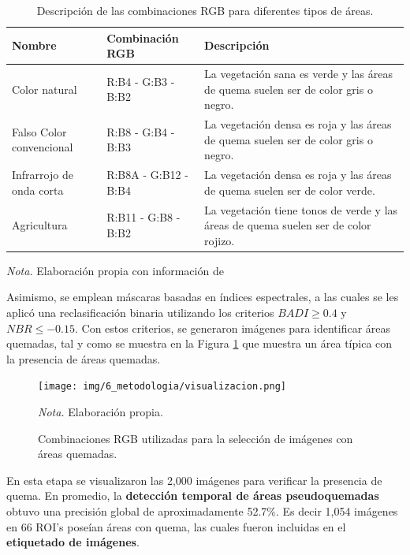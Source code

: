 \begin{table}[H]
    \centering
    \caption{Descripción de las combinaciones RGB para diferentes tipos de áreas.}
    \label{tab:combinaciones}
    \begin{tabularx}{\textwidth}{XXX}
        \hline
        \textbf{Nombre} & \textbf{Combinación RGB} & \textbf{Descripción}\\
        \hline
        Color natural & R:B4 - G:B3 - B:B2 & La vegetación sana es verde y las áreas de quema suelen ser de color gris o negro. \\
        Falso Color convencional & R:B8 - G:B4 - B:B3 & La vegetación densa es roja y las áreas de quema suelen ser de color gris o negro. \\
        Infrarrojo de onda corta & R:B8A - G:B12 - B:B4 & La vegetación densa es roja y las áreas de quema suelen ser de color verde. \\
        Agricultura & R:B11 - G:B8 - B:B2 & La vegetación tiene tonos de verde y las áreas de quema suelen ser de color rojizo. \\
        \hline
    \end{tabularx}
    \begin{flushleft}
        \textit{Nota.} Elaboración propia con información de \citet{Sentinel-Hub}        
        \vspace{-\baselineskip}
    \end{flushleft}
\end{table}


Asimismo, se emplean máscaras basadas en índices espectrales, a las cuales se les aplicó una reclasificación binaria utilizando los criterios 
$BADI \geq 0.4$ y $NBR \leq -0.15$. Con estos criterios, se generaron imágenes para identificar áreas quemadas, tal y como se muestra en la Figura \ref{fig:visualizacion} 
que muestra un área típica con la presencia de áreas quemadas.

\begin{figure}[H]
    \centering
    \caption{Combinaciones RGB utilizadas para la selección de imágenes con áreas quemadas.}
    \texttt{[image: img/6\_metodologia/visualizacion.png]}
    \label{fig:visualizacion}
    \begin{flushleft}
        \textit{Nota.} Elaboración propia.        
        \vspace{-\baselineskip}
    \end{flushleft}
\end{figure}

En esta etapa se visualizaron las 2,000 imágenes para verificar la presencia de quema. En promedio, la \textbf{detección temporal de áreas pseudoquemadas} obtuvo una precisión global de aproximadamente 52.7\%. 
Es decir 1,054 imágenes en 66 ROI's poseían áreas con quema, las cuales fueron incluidas en el \textbf{etiquetado de imágenes}. 

